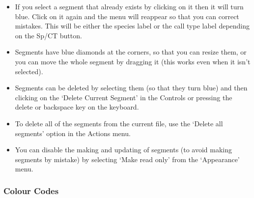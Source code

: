\documentclass{article}
\begin{document}
\begin{itemize}
\item If you select a segment that already exists by clicking on it then it will turn blue. Click on it again and the menu will reappear so that you can correct mistakes. This will be either the species label or the call type label depending on the Sp/CT button.
\item Segments have blue diamonds at the corners, so that you can resize them, or you can move the whole segment by dragging it (this works even when it isn't selected). 
\item Segments can be deleted by selecting them (so that they turn blue) and then clicking on the `Delete Current Segment' in the Controls or pressing the delete or backspace key on the keyboard. 
\item To delete all of the segments from the current file, use the `Delete all segments' option in the Actions menu. 
\item You can disable the making and updating of segments (to avoid making segments by mistake) by selecting `Make read only' from the `Appearance' menu.
\end{itemize}



\subsubsection*{Colour Codes}
\end{document}
